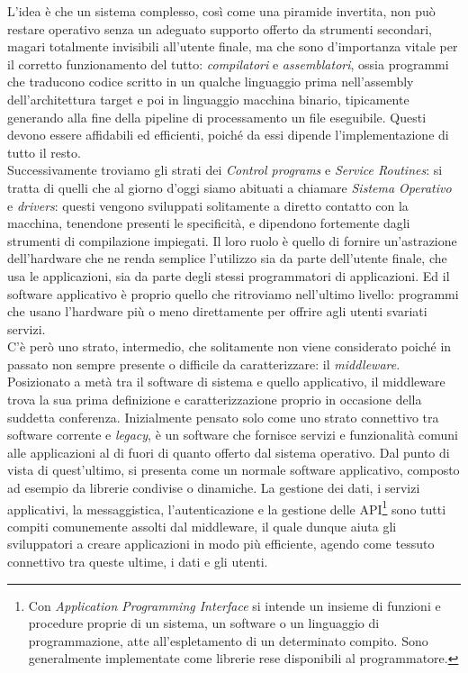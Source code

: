 L'idea è che un sistema complesso, così come una piramide invertita, non può restare operativo senza un adeguato supporto offerto da strumenti secondari, magari totalmente invisibili all'utente finale, ma che sono d'importanza vitale per il corretto funzionamento del tutto: \emph{compilatori} e \emph{assemblatori}, ossia programmi che traducono codice scritto in un qualche linguaggio prima nell'assembly dell'architettura target e poi in linguaggio macchina binario, tipicamente generando alla fine della pipeline di processamento un file eseguibile. Questi devono essere affidabili ed efficienti, poiché da essi dipende l'implementazione di tutto il resto.\\
Successivamente troviamo gli strati dei \emph{Control programs} e \emph{Service Routines}: si tratta di quelli che al giorno d'oggi siamo abituati a chiamare \emph{Sistema Operativo} e \emph{drivers}: questi vengono sviluppati solitamente a diretto contatto con la macchina, tenendone presenti le specificità, e dipendono fortemente dagli strumenti di compilazione impiegati. Il loro ruolo è quello di fornire un'astrazione dell'hardware che ne renda semplice l'utilizzo sia da parte dell'utente finale, che usa le applicazioni, sia da parte degli stessi programmatori di applicazioni. Ed il software applicativo è proprio quello che ritroviamo nell'ultimo livello: programmi che usano l'hardware più o meno direttamente per offrire agli utenti svariati servizi.\\
C'è però uno strato, intermedio, che solitamente non viene considerato poiché in passato non sempre presente o difficile da caratterizzare: il \emph{middleware}. Posizionato a metà tra il software di sistema e quello applicativo, il middleware trova la sua prima definizione e caratterizzazione proprio in occasione della suddetta conferenza. Inizialmente pensato solo come uno strato connettivo tra software corrente e \emph{legacy}, è un software che fornisce servizi e funzionalità comuni alle applicazioni al di fuori di quanto offerto dal sistema operativo. Dal punto di vista di quest’ultimo, si presenta come un normale software applicativo, composto ad esempio da librerie condivise o dinamiche. La gestione dei dati, i servizi applicativi, la messaggistica, l'autenticazione e la gestione delle API\footnote{Con \emph{Application Programming Interface} si intende un insieme di funzioni e procedure proprie di un sistema, un software o un linguaggio di programmazione, atte all'espletamento di un determinato compito. Sono generalmente implementate come librerie rese disponibili al programmatore.} sono tutti compiti comunemente assolti dal middleware, il quale dunque aiuta gli sviluppatori a creare applicazioni in modo più efficiente, agendo come tessuto connettivo tra queste ultime, i dati e gli utenti.\\

